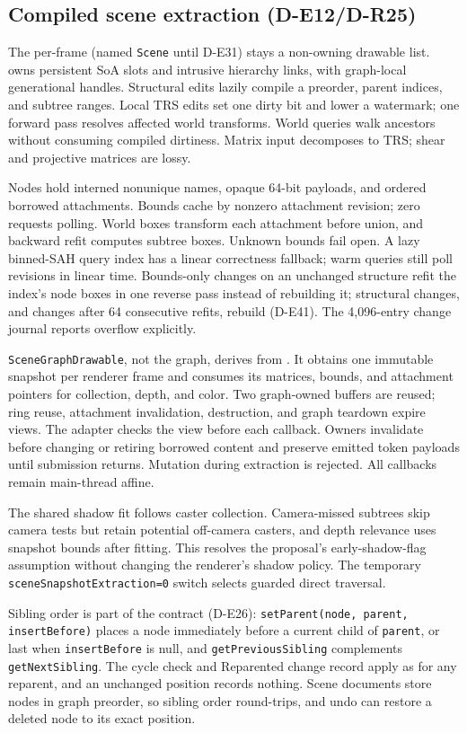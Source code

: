\subsection{Compiled scene extraction (D-E12/D-R25)}
The per-frame  (named \texttt{Scene} until D-E31) stays a
non-owning drawable list.
 owns persistent SoA slots and intrusive hierarchy links,
with graph-local generational handles. Structural edits lazily compile a
preorder, parent indices, and subtree ranges. Local TRS edits set one dirty bit
and lower a watermark; one forward pass resolves affected world transforms.
World queries walk ancestors without consuming compiled dirtiness. Matrix
input decomposes to TRS; shear and projective matrices are lossy.

Nodes hold interned nonunique names, opaque 64-bit payloads, and ordered borrowed
attachments. Bounds cache by nonzero attachment revision; zero requests polling.
World boxes transform each attachment before union, and backward refit computes
subtree boxes. Unknown bounds fail open. A lazy binned-SAH query index has a
linear correctness fallback; warm queries still poll revisions in linear time.
Bounds-only changes on an unchanged structure refit the index's node boxes in
one reverse pass instead of rebuilding it; structural changes, and changes
after 64 consecutive refits, rebuild (D-E41).
The 4,096-entry change journal reports overflow explicitly.

\texttt{SceneGraphDrawable}, not the graph, derives from
. It obtains one immutable snapshot per renderer frame
and consumes its matrices, bounds, and attachment pointers for collection,
depth, and color. Two graph-owned buffers are reused; ring reuse, attachment
invalidation, destruction, and graph teardown expire views. The adapter checks
the view before each callback. Owners invalidate before changing or retiring
borrowed content and preserve emitted token payloads until submission returns.
Mutation during extraction is rejected. All callbacks remain main-thread affine.

The shared shadow fit follows caster collection. Camera-missed subtrees skip
camera tests but retain potential off-camera casters, and depth relevance uses
snapshot bounds after fitting. This resolves the proposal's early-shadow-flag
assumption without changing the renderer's shadow policy. The temporary
\texttt{sceneSnapshotExtraction=0} switch selects guarded direct traversal.

Sibling order is part of the contract (D-E26):
\texttt{setParent(node, parent, insertBefore)} places a node immediately before
a current child of \texttt{parent}, or last when \texttt{insertBefore} is null,
and \texttt{getPreviousSibling} complements \texttt{getNextSibling}. The cycle
check and Reparented change record apply as for any reparent, and an unchanged
position records nothing. Scene documents store nodes in graph preorder, so
sibling order round-trips, and undo can restore a deleted node to its exact
position.

